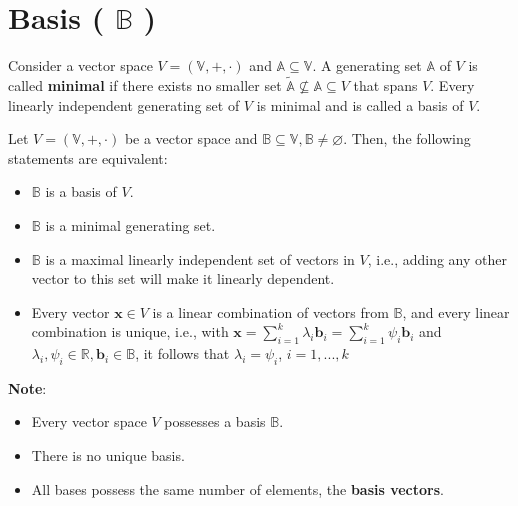 \section{Basis ( $\mathbb{B}$ ) \cite{mfml-1}}\label{lin-alg: Basis}
Consider a vector space $V = (\mathbb{V}, +, \cdot)$ and $\mathbb{A} \subseteq \mathbb{V}$. A generating set $\mathbb{A}$ of $V$ is called \textbf{minimal} if there exists no smaller set $\tilde{\mathbb{A}} \not\subseteq \mathbb{A} \subseteq V$ that spans $V$. Every linearly independent generating set of $V$ is minimal and is called a basis of $V$.

\vspace{0.2cm}
Let $V = (\mathbb{V}, +, \cdot)$ be a vector space and $\mathbb{B} \subseteq \mathbb{V}, \mathbb{B} \neq \varnothing$. Then, the following statements are equivalent:

\begin{itemize}
    \item $\mathbb{B}$ is a basis of $V$.
    
    \item $\mathbb{B}$ is a minimal generating set.
    
    \item $\mathbb{B}$ is a maximal linearly independent set of vectors in $V$, i.e., adding any other vector to this set will make it linearly dependent.

    \item Every vector $\mathbf{x} \in V$ is a linear combination of vectors from $\mathbb{B}$, and every linear combination is unique, i.e., with \( \displaystyle \mathbf{x} = \sum_{i=1}^{k} \lambda_i \mathbf{b}_i = \sum_{i=1}^{k} \psi_i \mathbf{b}_i \) and $\lambda_i, \psi_i \in \mathbb{R}, \mathbf{b}_i \in \mathbb{B}$, it follows that $\lambda_i = \psi_i$, $i=1,...,k$

    
\end{itemize}

\vspace{0.2cm}
\textbf{Note}:
\begin{itemize}
    \item Every vector space $V$ possesses a basis $\mathbb{B}$. 
    
    \item There is no unique basis. 
    
    \item All bases possess the same number of elements, the \textbf{basis vectors}\label{basis vectors}.

\end{itemize}

